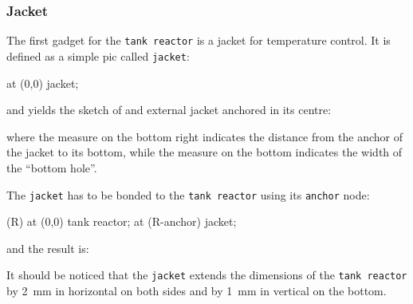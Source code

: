 \documentclass[12pt]{article}						%
\newcommand*{\chpn}[1]{\texttt{#1}}				%
\newcommand*{\chpp}[1]{\texttt{#1}}				%
\begin{document}
\subsubsection{Jacket}

The first gadget for the \chpp{tank reactor} is a jacket for temperature
control. It is defined as a simple pic called \chpp{jacket}:
\begin{chpcode}
	\pic at (0,0) {jacket};
\end{chpcode}
and yields the sketch of and external jacket anchored in its centre:
\begin{center}
\end{center}
where the measure on the bottom right indicates the distance from the anchor of
the jacket to its bottom, while the measure on the bottom indicates the width of
the ``bottom hole''.

The \chpp{jacket} has to be bonded to the \chpp{tank reactor} using its
\chpn{anchor} node:
\begin{chpcode}
	\pic (R) at (0,0) {tank reactor};
	\pic at (R-anchor) {jacket};
\end{chpcode}
and the result is:
\begin{center}
\end{center}
It should be noticed that the \chpp{jacket} extends the dimensions of the
\chpp{tank reactor} by \SI{2}{\mm} in horizontal on both sides and by
\SI{1}{\mm} in vertical on the bottom.
\end{document}
